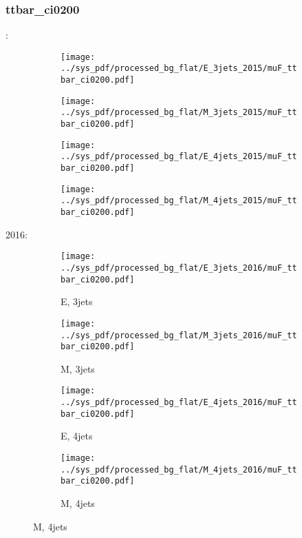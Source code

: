 \documentclass{beamer}
\begin{document}
\begin{frame}
\frametitle{ttbar_ci0200}
\fontsize{5}{1}:
\begin{figure}
\centering
\begin{subfigure}[b]{0.24\textwidth}
\texttt{[image: ../sys\_pdf/processed\_bg\_flat/E\_3jets\_2015/muF\_ttbar\_ci0200.pdf]}
\end{subfigure}
\begin{subfigure}[b]{0.24\textwidth}
\texttt{[image: ../sys\_pdf/processed\_bg\_flat/M\_3jets\_2015/muF\_ttbar\_ci0200.pdf]}
\end{subfigure}
\begin{subfigure}[b]{0.24\textwidth}
\texttt{[image: ../sys\_pdf/processed\_bg\_flat/E\_4jets\_2015/muF\_ttbar\_ci0200.pdf]}
\end{subfigure}
\begin{subfigure}[b]{0.24\textwidth}
\texttt{[image: ../sys\_pdf/processed\_bg\_flat/M\_4jets\_2015/muF\_ttbar\_ci0200.pdf]}
\end{subfigure}
\end{figure}
2016:
\begin{figure}
\centering
\begin{subfigure}[b]{0.24\textwidth}
\texttt{[image: ../sys\_pdf/processed\_bg\_flat/E\_3jets\_2016/muF\_ttbar\_ci0200.pdf]}
\captionsetup{font=tiny}
\caption{E, 3jets}
\end{subfigure}
\begin{subfigure}[b]{0.24\textwidth}
\texttt{[image: ../sys\_pdf/processed\_bg\_flat/M\_3jets\_2016/muF\_ttbar\_ci0200.pdf]}
\captionsetup{font=tiny}
\caption{M, 3jets}
\end{subfigure}
\begin{subfigure}[b]{0.24\textwidth}
\texttt{[image: ../sys\_pdf/processed\_bg\_flat/E\_4jets\_2016/muF\_ttbar\_ci0200.pdf]}
\captionsetup{font=tiny}
\caption{E, 4jets}
\end{subfigure}
\begin{subfigure}[b]{0.24\textwidth}
\texttt{[image: ../sys\_pdf/processed\_bg\_flat/M\_4jets\_2016/muF\_ttbar\_ci0200.pdf]}
\captionsetup{font=tiny}
\caption{M, 4jets}
\end{subfigure}
\end{figure}
\end{frame}
\end{document}
